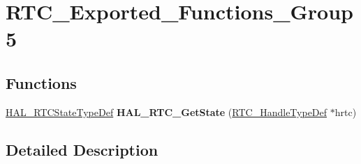 \hypertarget{group___r_t_c___exported___functions___group5}{}\section{R\+T\+C\+\_\+\+Exported\+\_\+\+Functions\+\_\+\+Group5}
\label{group___r_t_c___exported___functions___group5}
\subsection*{Functions}
\begin{DoxyCompactItemize}
\item 
\hyperlink{group___r_t_c___exported___types_ga1e2460a2d13c4efc7a2a1ab2a1ebd32b}{H\+A\+L\+\_\+\+R\+T\+C\+State\+Type\+Def} {\bfseries H\+A\+L\+\_\+\+R\+T\+C\+\_\+\+Get\+State} (\hyperlink{struct_r_t_c___handle_type_def}{R\+T\+C\+\_\+\+Handle\+Type\+Def} $\ast$hrtc)\hypertarget{group___r_t_c___exported___functions___group5_ga527ac04240b47a22bf5ff469609eaa4d}{}\label{group___r_t_c___exported___functions___group5_ga527ac04240b47a22bf5ff469609eaa4d}

\end{DoxyCompactItemize}


\subsection{Detailed Description}
